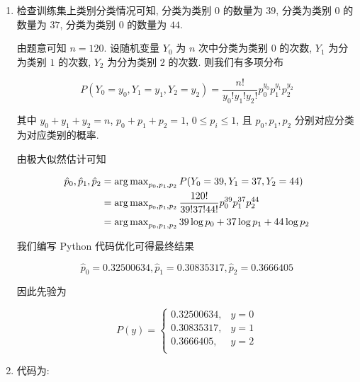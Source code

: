 \documentclass[answers]{exam}  %
\begin{document}
\begin{questions}
  \begin{solution}
    \begin{enumerate}
      \item

            检查训练集上类别分类情况可知, 分类为类别 $0$ 的数量为 $39$, 分类为类别 $0$ 的数量为 $37$, 分类为类别 $0$ 的数量为 $44$.

            由题意可知 $n=120$. 设随机变量 $Y_0$ 为 $n$ 次中分类为类别 $0$ 的次数, $Y_1$ 为分为类别 $1$ 的次数, $Y_2$ 为分为类别 $2$ 的次数. 则我们有多项分布

            $$
              P(Y_0=y_0, Y_1=y_1, Y_2=y_2) = \frac{n!}{y_0!y_1!y_2!}p_0^{y_0}p_1^{y_1}p_2^{y_2}
            $$

            其中 $y_0+y_1+y_2=n$, $p_0+p_1+p_2=1$, $0 \le p_i \le 1$, 且 $p_0, p_1, p_2$ 分别对应分类为对应类别的概率.

            由极大似然估计可知

            $$
              \begin{aligned}
                \hat{p}_0, \hat{p}_1, \hat{p}_2 & = \operatorname{arg\,max}_{p_0, p_1, p_2}P(Y_0=39, Y_1=37, Y_2=44)                      \\
                                                & = \operatorname{arg\,max}_{p_0, p_1, p_2}\frac{120!}{39!37!44!}p_0^{39}p_1^{37}p_2^{44} \\
                                                & = \operatorname{arg\,max}_{p_0, p_1, p_2}39\log p_0 + 37\log p_1 + 44\log p_2           \\
              \end{aligned}
            $$

            我们编写 Python 代码优化可得最终结果

            $$
              \hat{p}_0 = 0.32500634, \hat{p}_1 = 0.30835317, \hat{p}_2 = 0.3666405
            $$

            因此先验为

            $$
              P(y) = \begin{cases}
                0.32500634, & y = 0 \\
                0.30835317, & y = 1 \\
                0.3666405,  & y = 2 \\
              \end{cases}
            $$

      \item

            代码为:


\end{enumerate}
\end{solution}
\end{questions}
\end{document}
